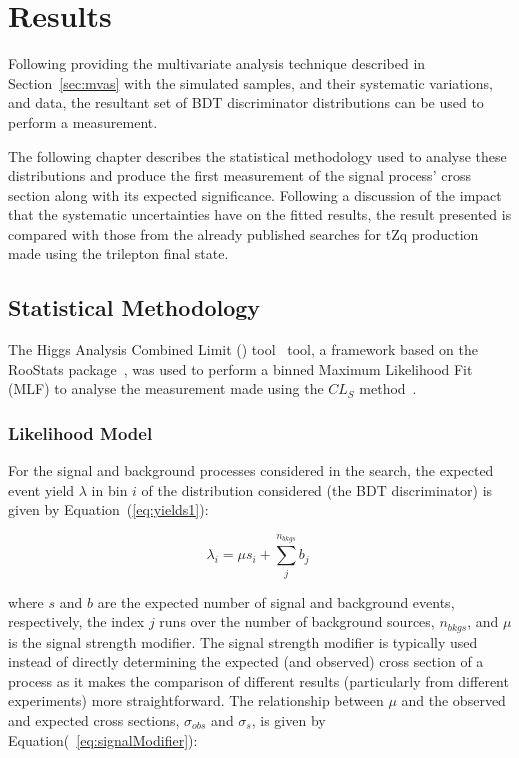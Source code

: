 \chapter{Results}\label{chapter:results}
Following providing the multivariate analysis technique described in Section~\ref{sec:mvas} with the simulated samples, and their systematic variations, and data, the resultant set of BDT discriminator distributions can be used to perform a measurement.

The following chapter describes the statistical methodology used to analyse these distributions and produce the first measurement of the signal process' cross section along with its expected significance.
Following a discussion of the impact that the systematic uncertainties have on the fitted results, the result presented is compared with those from the already published searches for tZq production made using the trilepton final state.

\section{Statistical Methodology}\label{sec:statisticalModel}
The Higgs Analysis Combined Limit (\combine) tool~\cite{Combine} tool, a framework based on the RooStats package~\cite{Moneta:2010pm,Schott:2012zb}, was used to perform a binned Maximum Likelihood Fit (MLF) to analyse the measurement made using the $CL_{S}$ method~\cite{CMS-NOTE-2011-005,Khachatryan:2014jba,AsymptoticFormulae}.

\subsection{Likelihood Model}\label{subsec:likelihoodModel}
For the signal and background processes considered in the search, the expected event yield $\lambda$ in bin $i$ of the distribution considered (\ie the BDT discriminator) is given by Equation~(\ref{eq:yields1}):

\begin{equation}
\lambda_{i} = \mu s_{i} + \sum\limits_{j}^{n_{bkgs}} b_{j} \;
\label{eq:yields1}
\end{equation}

where $s$ and $b$ are the expected number of signal and background events, respectively, the index $j$ runs over the number of background sources, $n_{bkgs}$, and $\mu$ is the signal strength modifier.
The signal strength modifier is typically used instead of directly determining the expected (and observed) cross section of a process as it makes the comparison of different results (particularly from different experiments) more straightforward. 
The relationship between $\mu$ and the observed and expected cross sections, $\sigma_{obs}$ and $\sigma_{s}$, is given by Equation(~\ref{eq:signalModifier}):

